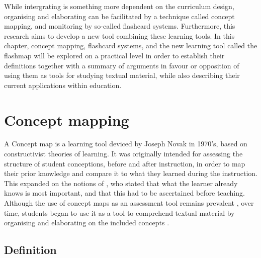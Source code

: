 While intergrating is something more dependent on the curriculum design, organising and elaborating can be facilitated by a technique called concept mapping, and monitoring by so-called flashcard systems. Furthermore, this research aims to develop a new tool combining these learning tools. In this chapter, concept mapping, flashcard systems, and the new learning tool called the flashmap will be explored on a practical level in order to establish their definitions together with a summary of arguments in favour or opposition of using them as tools for studying textual material, while also describing their current applications within education.

\section{Concept mapping}

A Concept map is a learning tool deviced by Joseph Novak in 1970's, based on constructivist theories of learning. It was originally intended for assessing the structure of student conceptions, before and after instruction, in order to map their prior knowledge and compare it to what they learned during the instruction. This expanded on the notions of , who stated that what the learner already knows is most important, and that this had to be ascertained before teaching. Although the use of concept maps as an assessment tool remains prevalent \cite{canas, chung, hwang2, ruiz1}, over time, students began to use it as a tool to comprehend textual material by organising and elaborating on the included concepts \cite{canas, eppler, hwang2, karpicke2, nesbit2}.

\subsection{Definition}

